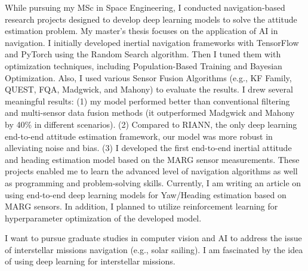 \documentclass[a4,25pt]{article}
\begin{document}
\begin{large}
\vspace{-0.25cm}\quad 
While pursuing my MSc in Space Engineering, I conducted navigation-based research projects designed to develop deep learning models to solve the attitude estimation problem. My master's thesis focuses on the application of AI in navigation. I initially developed inertial navigation frameworks with TensorFlow and PyTorch using the Random Search algorithm. Then I tuned them with optimization techniques, including Population-Based Training and Bayesian Optimization. Also, I used various Sensor Fusion Algorithms (e.g., KF Family, QUEST, FQA, Madgwick, and Mahony) to evaluate the results. I drew several meaningful results: (1) my model performed better than conventional filtering and multi-sensor data fusion methods (it outperformed Madgwick and Mahony by 40\% in different scenarios). (2) Compared to RIANN, the only deep learning end-to-end attitude estimation framework, our model was more robust in alleviating noise and bias. (3) I developed the first end-to-end inertial attitude and heading estimation model based on the MARG sensor measurements. These projects enabled me to learn the advanced level of navigation algorithms as well as programming and problem-solving skills. Currently, I am writing an article on using end-to-end deep learning models for Yaw/Heading estimation based on MARG sensors. In addition, I planned to utilize reinforcement learning for hyperparameter optimization of the developed model. \par
\vspace{-0.25cm}\quad 
I want to pursue graduate studies in computer vision and AI to address the issue of interstellar missions navigation (e.g., solar sailing). I am fascinated by the idea of using deep learning for interstellar missions. 

\end{large}
\end{document}
